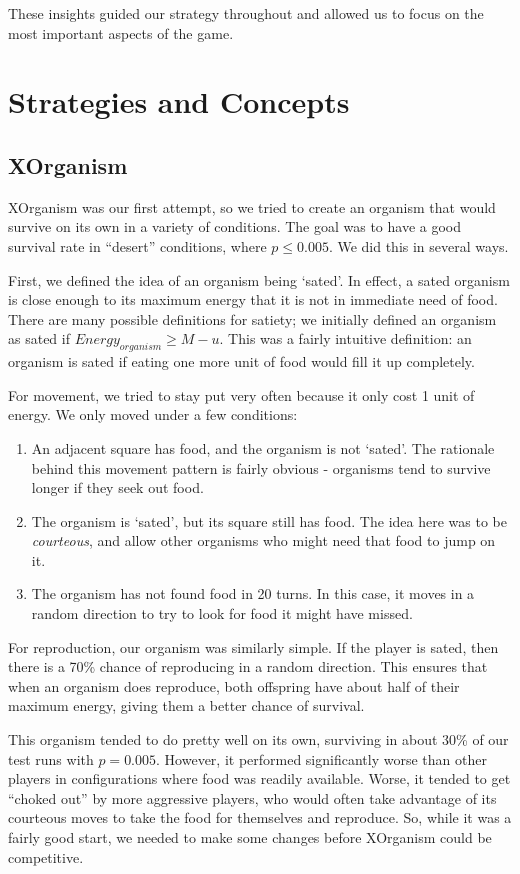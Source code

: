 \documentclass[
10pt, %
letterpaper, %
oneside, %
headinclude,footinclude, %
english
]{article}
\begin{document}
These insights guided our strategy throughout and allowed us to focus on the most important aspects of the game.

\section{Strategies and Concepts}

\subsection{XOrganism}

XOrganism was our first attempt, so we tried to create an organism that would survive on its own in a variety of conditions. The goal was to have a good survival rate in ``desert'' conditions, where $p \leq 0.005$. We did this in several ways.

First, we defined the idea of an organism being `sated'. In effect, a sated organism is close enough to its maximum energy that it is not in immediate need of food. There are many possible definitions for satiety; we initially defined an organism as sated if $Energy_{organism} \geq M - u$. This was a fairly intuitive definition: an organism is sated if eating one more unit of food would fill it up completely.

For movement, we tried to stay put very often because it only cost 1 unit of energy. We only moved under a few conditions:
\begin{enumerate}
  \item An adjacent square has food, and the organism is not `sated'. The rationale behind this movement pattern is fairly obvious - organisms tend to survive longer if they seek out food.
  \item The organism is `sated', but its square still has food. The idea here was to be \textit{courteous}, and allow other organisms who might need that food to jump on it.
  \item The organism has not found food in 20 turns. In this case, it moves in a random direction to try to look for food it might have missed.
\end{enumerate}
For reproduction, our organism was similarly simple. If the player is sated, then there is a 70\% chance of reproducing in a random direction. This ensures that when an organism does reproduce, both offspring have about half of their maximum energy, giving them a better chance of survival.

This organism tended to do pretty well on its own, surviving in about 30\% of our test runs with $p=0.005$. However, it performed significantly worse than other players in configurations where food was readily available. Worse, it tended to get ``choked out'' by more aggressive players, who would often take advantage of its courteous moves to take the food for themselves and reproduce. So, while it was a fairly good start, we needed to make some changes before XOrganism could be competitive.
\end{document}
